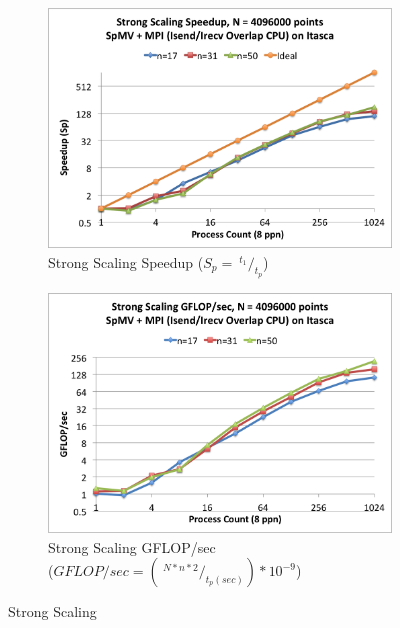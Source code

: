 \documentclass{report}
\begin{document}
\begin{figure}
\centering
\begin{subfigure}[t]{0.48\textwidth}
\centering
\includegraphics[width=\textwidth]{performance_content/scaling/strong_scaling_speedup_4M_overlap_cpu_SpMV_and_comm_all_stencils.png}
\caption{Strong Scaling Speedup ($S_p = \ ^{t_{1}}/_{t_p}$)}
\label{fig:compare_strong_scaling_speedup_all_stencils}
\end{subfigure}
\quad
\begin{subfigure}[t]{0.48\textwidth}
\centering
\includegraphics[width=\textwidth]{performance_content/scaling/strong_scaling_gflops_4M_overlap_cpu_SpMV_and_comm_all_stencils.png}
\caption{Strong Scaling GFLOP/sec \\ ($GFLOP/sec = (\ ^{N * n * 2}/_{t_p  (sec)}) * 10^{-9}$)}
\label{fig:compare_strong_scaling_gflops_all_stencils}
\end{subfigure}
\caption{Strong Scaling}
\end{figure} 
\end{document}
